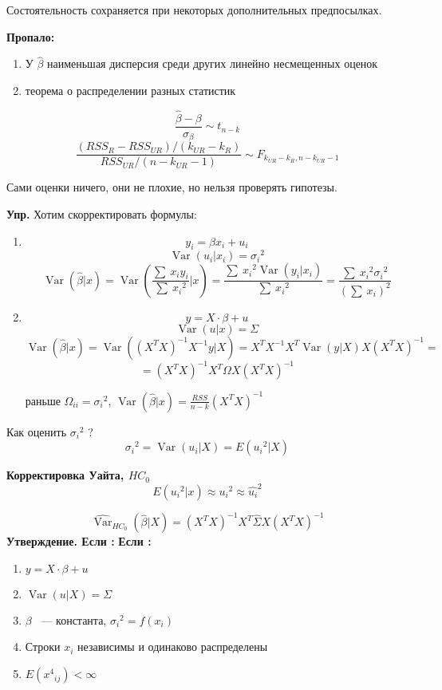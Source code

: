 \documentclass[12pt]{article} %
\theoremstyle{definition} %
\DeclareMathOperator{\Var}{Var}
\begin{document}
\par

Состоятельность сохраняется при некоторых дополнительных предпосылках.

\par

\textbf{Пропало:}
\begin{enumerate}
\item У $ \hat{\beta}  $  наименьшая дисперсия среди других линейно несмещенных оценок
\item  теорема о распределении разных статистик
\end{enumerate}
\[ \frac{ \hat{\beta} - \beta }{\sigma_{\beta}} \sim  t_{n-k}  \]
\[ \frac{(RSS_R - RSS_{UR})/(k_{UR} - k_R)}{RSS_{UR}/(n-k_{UR} - 1)} \sim F_{k_{UR} - k_R
, n-k_{UR} - 1}   \]
\par
Сами оценки ничего, они не плохие, но нельзя проверять гипотезы.
\par


\textbf{Упр.}
 Хотим скорректировать формулы:
\begin{enumerate}

\item
\[y_i = \beta x_i + u_i\]
\[\Var(u_i |x_i) = {\sigma_i}^2 \]
\[\Var(\hat{\beta} |x) = \Var \left (\frac{\displaystyle\sum\ {x_i y_i}}{\displaystyle\sum\ {x_i} ^2}|x \right) =\frac{\displaystyle\sum\ {x_i}^2 \Var(y_i|x_i)}{\displaystyle\sum\ {x_i} ^2} = \frac{\displaystyle\sum\ {x_i}^2 {\sigma_i}^2}{{(\displaystyle\sum\ {x_i}) ^2}}  \]
\item
\[y = X \cdot \beta + u\]
\[\Var(u|x) = \Sigma  \]
\[\Var(\hat{\beta} |x) =  \Var ((X^T X)^{-1} X^{-1} y |X ) = X^T X^{-1} X^T \Var(y|X) X (X^T X)^{-1} =\]
\[ =  (X^T X) ^{-1} X^T \Omega X (X^T X)^ {-1}\]

раньше $ \Omega_{ii} = {\sigma_{i}} ^2$,
$\Var (\hat{\beta} |x) = \frac {RSS}{n-k} (X^T X)^{-1}$
\end{enumerate}
\par
Как оценить ${\sigma_i}^2$ ?
\[{\sigma_i}^2 = \Var(u_i |X) = E({u_i}^2 |X) \]
\par
\textbf{Корректировка Уайта, $HC_0$}
\[E({u_i}^2|x) \approx {u_i}^2 \approx {\hat{u_i}^2}\]

\[{\hat{\Var}}_{HC_0} (\hat{\beta}|X) = (X^T X)^{-1} X^T \hat{\Sigma} X (X^T X) ^ {-1}   \]
\textbf{Утверждение. Если :}
\textbf{ Если :}
\begin{enumerate}

\item  $y = X \cdot \beta + u$
\item  $\Var(u|X) = \Sigma $
\item  $\beta$ ~---  константа, $ {{\sigma}_i}^2 = f(x_i)$
\item  Строки $x_i$ независимы и одинаково распределены
\item  $E({x^4}_{ij}) < \infty$
\end{enumerate}
\end{document}
